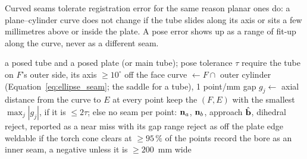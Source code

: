 Curved seams tolerate registration error for the same reason planar ones do: a plane--cylinder curve
does not change if the tube slides along its axis or sits a few millimetres above or inside the plate.
A pose error shows up as a range of fit-up along the curve, never as a different seam.

\begin{algorithm}[htbp]
\caption{Curved seam of a tube on a plate, or of a branch on a tube}
\label{alg:curved_seam}
\begin{algorithmic}[1]
\REQUIRE a posed tube and a posed plate (or main tube); pose tolerance $\tau$
  \STATE require the tube on $F$'s outer side, its axis $\ge10^\circ$ off the face
  \STATE curve $\gets F\cap$ outer cylinder (Equation~\ref{eq:ellipse_seam}; the saddle for a tube), 1 point/mm
  \STATE gap $g_j\gets$ axial distance from the curve to $E$ at every point
\ENDFOR
\STATE keep the $(F,E)$ with the smallest $\max_j|g_j|$, if it is $\le2\tau$; else no seam
\STATE per point: $\mathbf{n}_a$, $\mathbf{n}_b$, approach $\hat{\mathbf{b}}$, dihedral
  \STATE reject, reported as a near miss with its gap range
  \STATE reject as off the plate edge
\ELSE
  \STATE weldable if the torch cone clears at $\ge95\,\%$ of the points
\ENDIF
\STATE record the bore as an inner seam, a negative unless it is $\ge200$~mm wide
\end{algorithmic}
\end{algorithm}

